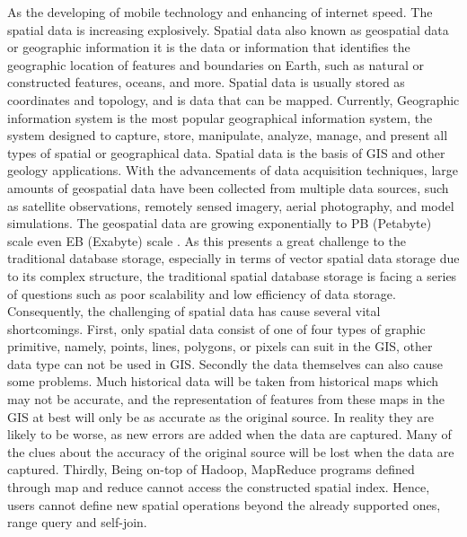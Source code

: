 As the developing of mobile technology and enhancing of internet speed. The spatial data is increasing explosively. Spatial data also known as geospatial data or geographic information it is the data or information that identifies the geographic location of features and boundaries on Earth, such as natural or constructed features, oceans, and more. Spatial data is usually stored as coordinates and topology, and is data that can be mapped. Currently, Geographic information system is the most popular geographical information system, the system designed to capture, store, manipulate, analyze, manage, and present all types of spatial or geographical data. Spatial data is the basis of GIS and other geology applications.  With the advancements of data acquisition techniques, large amounts of geospatial data have been collected from multiple data sources, such as satellite observations, remotely sensed imagery, aerial photography, and model simulations. The geospatial data are growing exponentially to PB (Petabyte) scale even EB (Exabyte) scale . As this presents a great challenge to the traditional database storage, especially in terms of vector spatial data storage due to its complex structure, the traditional spatial database storage is facing a series of questions such as poor scalability and low efficiency of data storage. Consequently, the challenging of spatial data has cause several vital shortcomings. First, only spatial data consist of one of four types of graphic primitive, namely, points, lines, polygons, or pixels can suit in the GIS, other data type can not be used in GIS. Secondly the data themselves can also cause some problems. Much historical data will be taken from historical maps which may not be accurate, and the representation of features from these maps in the GIS at best will only be as accurate as the original source. In reality they are likely to be worse, as new errors are added when the data are captured. Many of the clues about the accuracy of the original source will be lost when the data are captured.  Thirdly, Being on-top of Hadoop, MapReduce programs defined through map and reduce cannot access the constructed spatial index. Hence, users cannot define new spatial operations beyond the already supported ones, range query and self-join.

